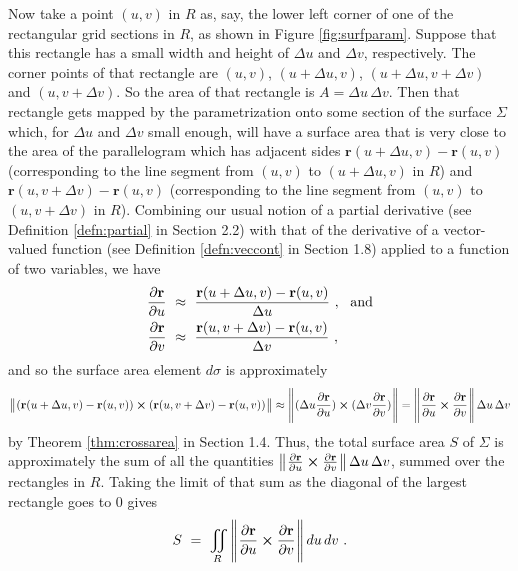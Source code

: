 Now take a point $(u,v)$ in $R$ as, say,
the lower left corner of one of the rectangular grid sections in $R$, as shown in Figure \ref{fig:surfparam}. Suppose
that this rectangle has a small width and height of $\Delta u$ and $\Delta v$, respectively. 
The corner points of that
rectangle are $(u,v)$, $(u+\Delta u,v)$, $(u+\Delta u,v+\Delta v)$ and $(u,v+\Delta v)$.
So the area of that
rectangle is $A = \Delta u\,\Delta v$. 
Then that rectangle gets mapped by the parametrization onto some section of the
surface $\Sigma$ which, for $\Delta u$ and $\Delta v$ small enough, will have a surface area that
is very close to the area of the parallelogram which has adjacent sides $\mathbf{r}(u+\Delta u,v) - \mathbf{r}(u,v)$
(corresponding to the line segment from $(u,v)$ to $(u+\Delta u,v)$ in $R$) and
$\mathbf{r}(u,v+\Delta v) - \mathbf{r}(u,v)$ (corresponding to the line segment from $(u,v)$ to $(u,v+\Delta v)$ in
$R$). 
Combining our usual notion of a partial derivative (see Definition \ref{defn:partial} in
Section 2.2) with that of the derivative of a vector-valued function (see Definition \ref{defn:veccont} in
Section 1.8) applied to a function of two variables, we have
\begin{align*}
 \frac{\partial \mathbf{r}}{\partial u} ~&\approx~ \frac{\mathbf{r}(u+\Delta u,v) - \mathbf{r}(u,v)}{\Delta u}
 ~,~~\text{and}\smallskip\\
 \frac{\partial \mathbf{r}}{\partial v} ~&\approx~ \frac{\mathbf{r}(u,v+\Delta v) - \mathbf{r}(u,v)}{\Delta v} ~,
\end{align*}
and so the surface area element $d\sigma$ is approximately
\begin{displaymath}
 \bigl\lVert\mspace{1mu}(\mathbf{r}(u+\Delta u,v) - \mathbf{r}(u,v)) \bm{\times} (\mathbf{r}(u,v+\Delta v) - \mathbf{r}(u,v))\mspace{1mu}\bigr\rVert \approx
 \Biggl\lVert\mspace{1mu}(\Delta u \frac{\partial \mathbf{r}}{\partial u}) \bm{\times} (\Delta v\frac{\partial \mathbf{r}}{\partial v})\mspace{1mu}\Biggr\rVert
 = \Biggl\lVert\mspace{1mu}\frac{\partial \mathbf{r}}{\partial u} \bm{\times} \frac{\partial \mathbf{r}}{\partial v}\mspace{1mu}\Biggr\rVert\,
 \Delta u \, \Delta v
\end{displaymath}
by Theorem \ref{thm:crossarea} in Section 1.4.
Thus, the total surface area $S$ of $\Sigma$ is approximately the sum of all the quantities
$\bigl\lVert\mspace{1mu}\frac{\partial \mathbf{r}}{\partial u} \bm{\times} \frac{\partial \mathbf{r}}{\partial v}\mspace{1mu}\bigr\rVert\,\Delta u\,\Delta v$,
summed over the rectangles in $R$. Taking the limit of that sum as the diagonal of the largest rectangle goes to $0$
gives
\begin{equation}
 S ~=~ \iint\limits_{R}\,\Biggl\lVert\mspace{1mu}\frac{\partial \mathbf{r}}{\partial u} \bm{\times} \frac{\partial \mathbf{r}}{\partial v}\mspace{1mu}\Biggr\rVert
 \,du\,dv ~.
\end{equation}
